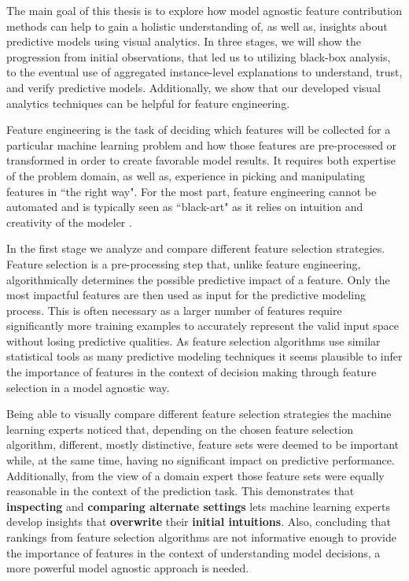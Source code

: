 The main goal of this thesis is to explore how model agnostic feature contribution methods can help to gain a holistic understanding of, as well as, insights about predictive models using visual analytics. In three stages, we will show the progression from initial observations, that led us to utilizing black-box analysis, to the eventual use of aggregated instance-level explanations to understand, trust, and verify predictive models. Additionally, we show that our developed visual analytics techniques can be helpful for feature engineering.

Feature engineering is the task of deciding which features will be collected for a particular machine learning problem and how those features are pre-processed or transformed in order to create favorable model results. It requires both expertise of the problem domain, as well as, experience in picking and manipulating features in ``the right way". For the most part, feature engineering cannot be automated and is typically seen as ``black-art" as it relies on intuition and creativity of the modeler \cite{Domingos:2012:FUT:2347736.2347755}.

In the first stage we analyze and compare different feature selection strategies. Feature selection is a pre-processing step that, unlike feature engineering, algorithmically determines the possible predictive impact of a feature. Only the most impactful features are then used as input for the predictive modeling process. This is often necessary as a larger number of features require significantly more training examples to accurately represent the valid input space without losing predictive qualities. As feature selection algorithms use similar statistical tools as many predictive modeling techniques it seems plausible to infer the importance of features in the context of decision making through feature selection in a model agnostic way.

Being able to visually compare different feature selection strategies the machine learning experts noticed that, depending on the chosen feature selection algorithm, different, mostly distinctive, feature sets were deemed to be important while, at the same time, having no significant impact on predictive performance. Additionally, from the view of a domain expert those feature sets were equally reasonable in the context of the prediction task.
This demonstrates that \textbf{inspecting} and \textbf{comparing alternate settings} lets machine learning experts develop insights that \textbf{overwrite} their \textbf{initial intuitions}.
Also, concluding that rankings from feature selection algorithms are not informative enough to provide the importance of features in the context of understanding model decisions, a more powerful model agnostic approach is needed.


